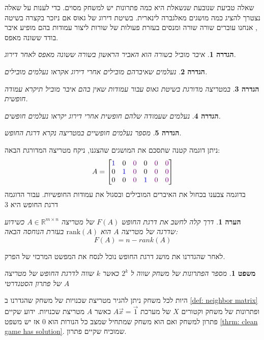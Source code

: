 \documentclass[12pt,leqno]{article}
\theoremstyle{theoremdd}
\newtheorem{definition}{הגדרה}[section]
\newtheorem{theorem}{משפט}[section]
\newtheorem{comm}{הערה}[section]
\begin{document}
שאלה טביעת שנובעת שנשאלת היא כמה פתרונות יש למשחק מסוים.
כדי לענות על שאלה נצטרך להציג כמה מושגים מאלגברה לינארית.
בשיטת דירוג של גאוס אם ניזכר בקצרה בשיטה ,
אנחנו עוברים שורה שורה ומנסים בעזרת פעולות של שורות 
ליצור עמודות בהם מופיע איבר בודד ששונה מאפס.
\begin{definition}
    איבר מוביל בשורה הוא האביר הראשון בשורה ששונה מאפס 
    לאחר דירוג.
\end{definition}
\begin{definition}
    נעלמים שאיברהם מובילים אחרי דירוג אקראו נעלמים מובילים.
\end{definition}
\begin{definition}
    במטריצה מדורגת בשיטת גאוס עבור עמודות שאין בהם איבר מוביל 
    תיקרא עמודה חופשית.
\end{definition}
\begin{definition}
    נעלמים שעמודה שלהם חופשית אחרי דירוג יקראו נעלמים חופשים.
\end{definition}
\begin{definition}
    מספר נעלמים חופשיים במטריצה נקרא
    דרגת החופש.
\end{definition}
ניתן דוגמה קטנה שתסכם את המושגים שהצגנו,
ניקח מטריצה  המדורגת הבאה:
\[
    A = \begin{bmatrix}
        {\color{blue}1} & 0 &  {\color{violet}0} & 0 &  {\color{violet}0} &  {\color{violet}0}\\
        0 &{\color{blue}1} & {\color{violet}0} & 0  &  {\color{violet}0} &  {\color{violet}0}\\
        0 & 0 &  {\color{violet}0} &{\color{blue}1} &  {\color{violet}0} &  {\color{violet}0}
    \end{bmatrix}
\]
בדוגמה צבענו בכחול את האיברים המובילים
ובסגול את עמודות החופשיות.
עבור הדוגמה דרגת החופש היא 3
\begin{comm}
    דרך קלה לחשב את דרגת החופש
    $F(A)$
    של מטריצה 
    $A \in\mathbb{R}^{m \times n}$
    כשידוע שדרגה של מטריצה
    $A$
    הוא 
    $\mathrm{rank}(A) $
    בעזרת הנוחסה הבאה:
    \[
        F(A) = n - rank(A)
    \]
\end{comm}
לאחר שהגדרנו את מושג דרגת החופש נוכל לנסח את המפשט המרכזי של הפרק.
\begin{theorem}
    מספר הפתרונות של משחק 
    שווה ל 
    $2^{k}$
    כאשר 
    $k$
    שווה לדרגת החופש של מטריצה
    $A$
    של פתרון הסטנדרטי
\end{theorem}
היות לכל משחק ניתן להגיר מטריצת שכנויות של משחק שהגדרנו 
ב
\ref{def: neighbor matrix}
ופתרונות של משחק וקטורים
$X$
של מערכת
$A \vec x = \vec{1}$
כאשר 
$A$
מטריצת שכנויות.
ידוע שקיים פתרון למשחק ואם הוא משחק שמתחיל שמצב כל הנורות הוא
$0$
אז יש משפט 
\ref{thrm: clean game has solution}.
שמוכיח שקיים פתרון.
\end{document}
